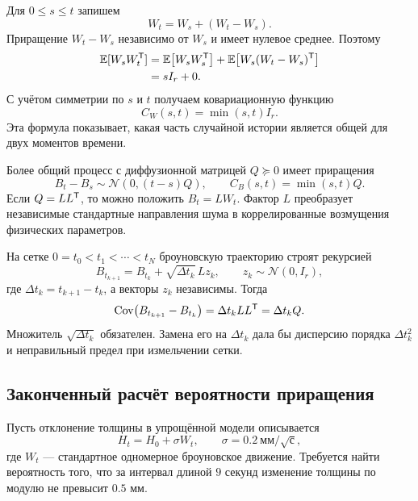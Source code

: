 Для $0\leq s\leq t$ запишем
\[
W_t=W_s+(W_t-W_s).
\]
Приращение $W_t-W_s$ независимо от $W_s$ и имеет нулевое среднее. Поэтому
\begin{align}
\mathbb{E}[W_sW_t^{\mathsf{T}}]
&=
\mathbb{E}\!\left[
W_sW_s^{\mathsf{T}}
\right]
+
\mathbb{E}\!\left[
W_s(W_t-W_s)^{\mathsf{T}}
\right]
\\
&=
sI_r+0.
\end{align}
С учётом симметрии по $s$ и $t$ получаем ковариационную функцию
\begin{equation}
\label{eq:brownian-covariance-v01}
C_W(s,t)=\min(s,t)I_r.
\end{equation}
Эта формула показывает, какая часть случайной истории является общей для двух моментов времени.

Более общий процесс с диффузионной матрицей $Q\succeq0$ имеет приращения
\begin{equation}
\label{eq:brownian-general-covariance-v01}
B_t-B_s
\sim
\mathcal N\!\left(0,(t-s)Q\right),
\qquad
C_B(s,t)=\min(s,t)Q.
\end{equation}
Если $Q=LL^{\mathsf{T}}$, то можно положить $B_t=LW_t$. Фактор $L$ преобразует независимые стандартные направления шума в коррелированные возмущения физических параметров.

\begin{computationalnote}
На сетке $0=t_0<t_1<\cdots<t_N$ броуновскую траекторию строят рекурсией
\begin{equation}
\label{eq:brownian-discrete-simulation-v01}
B_{t_{k+1}}
=
B_{t_k}
+
\sqrt{\Delta t_k}\,Lz_k,
\qquad
z_k\sim\mathcal N(0,I_r),
\end{equation}
где $\Delta t_k=t_{k+1}-t_k$, а векторы $z_k$ независимы. Тогда
\[
\operatorname{Cov}
\bigl(B_{t_{k+1}}-B_{t_k}\bigr)
=
\Delta t_kLL^{\mathsf{T}}
=
\Delta t_kQ.
\]
Множитель $\sqrt{\Delta t_k}$ обязателен. Замена его на $\Delta t_k$ дала бы дисперсию порядка $\Delta t_k^2$ и неправильный предел при измельчении сетки.
\end{computationalnote}

\subsection{Законченный расчёт вероятности приращения}

Пусть отклонение толщины в упрощённой модели описывается
\begin{equation}
\label{eq:thickness-brownian-model-v01}
H_t=H_0+\sigma W_t,
\qquad
\sigma=0.2\ \text{мм}/\sqrt{\text{с}},
\end{equation}
где $W_t$ --- стандартное одномерное броуновское движение. Требуется найти вероятность того, что за интервал длиной $9$ секунд изменение толщины по модулю не превысит $0.5$ мм.

